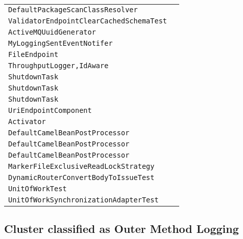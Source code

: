 \begin{center}
\begin{tabular}{ll}
\lstinline/DefaultPackageScanClassResolver/&\raisebox{0pt}{\lstinline/addIfMatching(PackageScanFilter)/}\\
\lstinline/ValidatorEndpointClearCachedSchemaTest/&\raisebox{0pt}{\lstinline/clearCachedSchema()/}\\
\lstinline/ActiveMQUuidGenerator/&\raisebox{0pt}{\lstinline/StringsanitizeHostName(StringhostName)/}\\
\lstinline/MyLoggingSentEventNotifer/&\raisebox{0pt}{\lstinline/notify(EventObjectevent)/}\\
\lstinline/FileEndpoint/&\raisebox{0pt}{\lstinline/FileConsumercreateConsumer(Processorprocessor)/}\\
\lstinline/ThroughputLogger,IdAware/&\raisebox{0pt}{\lstinline/doStart()/}\\
\lstinline/ShutdownTask/&\raisebox{0pt}{\lstinline/run()/}\\
\lstinline/ShutdownTask/&\raisebox{0pt}{\lstinline/run()/}\\
\lstinline/ShutdownTask/&\raisebox{0pt}{\lstinline/run()/}\\
\lstinline/UriEndpointComponent/&\raisebox{0pt}{\lstinline/doWith(Field)/}\\
\lstinline/Activator/&\raisebox{0pt}{\lstinline/extenderCapabilityWired(Bundlebundle)/}\\
\lstinline/DefaultCamelBeanPostProcessor/&\raisebox{0pt}{\lstinline/setterPropertyInjection(Method)/}\\
\lstinline/DefaultCamelBeanPostProcessor/&\raisebox{0pt}{\lstinline/setterInjection(Method)/}\\
\lstinline/DefaultCamelBeanPostProcessor/&\raisebox{0pt}{\lstinline/setterBeanInjection(Method,String,Object,String)/}\\
\lstinline/MarkerFileExclusiveReadLockStrategy/&\raisebox{0pt}{\lstinline/deleteLockFiles()/}\\
\lstinline/DynamicRouterConvertBodyToIssueTest/&\raisebox{0pt}{\lstinline/Stringslip(String))/}\\
\lstinline/UnitOfWorkTest/&\raisebox{0pt}{\lstinline/process(Exchange)/}\\
\lstinline/UnitOfWorkSynchronizationAdapterTest/&\raisebox{0pt}{\lstinline/process(Exchange)/}\\

\bottomrule
\end{tabular}
\end{center}


\subsection{Cluster classified as Outer Method Logging}

